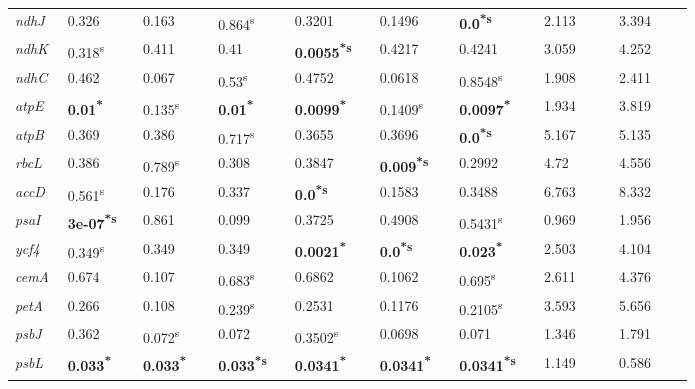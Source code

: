 \documentclass[a4paper]{article}
\begin{document}
\begin{tabular}{p{0.03\linewidth}|p{0.095\linewidth}p{0.095\linewidth}p{0.095\linewidth}|p{0.095\linewidth}p{0.095\linewidth}p{0.095\linewidth}|p{0.095\linewidth}p{0.095\linewidth}}
\textit{ndhJ} & 0.326 & 0.163 & 0.864\textsuperscript{s} & 0.3201 & 0.1496 & \textbf{0.0\textsuperscript{*}\textsuperscript{s}} & 2.113 & 3.394\\
 \rowcolor{black!20} \textit{ndhK} & 0.318\textsuperscript{s} & 0.411 & 0.41 & \textbf{0.0055\textsuperscript{*}\textsuperscript{s}} & 0.4217 & 0.4241 & 3.059 & 4.252\\
\textit{ndhC} & 0.462 & 0.067 & 0.53\textsuperscript{s} & 0.4752 & 0.0618 & 0.8548\textsuperscript{s} & 1.908 & 2.411\\
 \rowcolor{black!20} \textit{atpE} & \textbf{0.01\textsuperscript{*}} & 0.135\textsuperscript{s} & \textbf{0.01\textsuperscript{*}} & \textbf{0.0099\textsuperscript{*}} & 0.1409\textsuperscript{s} & \textbf{0.0097\textsuperscript{*}} & 1.934 & 3.819\\
\textit{atpB} & 0.369 & 0.386 & 0.717\textsuperscript{s} & 0.3655 & 0.3696 & \textbf{0.0\textsuperscript{*}\textsuperscript{s}} & 5.167 & 5.135\\
 \rowcolor{black!20} \textit{rbcL} & 0.386 & 0.789\textsuperscript{s} & 0.308 & 0.3847 & \textbf{0.009\textsuperscript{*}\textsuperscript{s}} & 0.2992 & 4.72 & 4.556\\
\textit{accD} & 0.561\textsuperscript{s} & 0.176 & 0.337 & \textbf{0.0\textsuperscript{*}\textsuperscript{s}} & 0.1583 & 0.3488 & 6.763 & 8.332\\
 \rowcolor{black!20} \textit{psaI} & \textbf{3e-07\textsuperscript{*}\textsuperscript{s}} & 0.861 & 0.099 & 0.3725 & 0.4908 & 0.5431\textsuperscript{s} & 0.969 & 1.956\\
\textit{ycf4} & 0.349\textsuperscript{s} & 0.349 & 0.349 & \textbf{0.0021\textsuperscript{*}} & \textbf{0.0\textsuperscript{*}\textsuperscript{s}} & \textbf{0.023\textsuperscript{*}} & 2.503 & 4.104\\
 \rowcolor{black!20} \textit{cemA} & 0.674 & 0.107 & 0.683\textsuperscript{s} & 0.6862 & 0.1062 & 0.695\textsuperscript{s} & 2.611 & 4.376\\
\textit{petA} & 0.266 & 0.108 & 0.239\textsuperscript{s} & 0.2531 & 0.1176 & 0.2105\textsuperscript{s} & 3.593 & 5.656\\
 \rowcolor{black!20} \textit{psbJ} & 0.362 & 0.072\textsuperscript{s} & 0.072 & 0.3502\textsuperscript{s} & 0.0698 & 0.071 & 1.346 & 1.791\\
\textit{psbL} & \textbf{0.033\textsuperscript{*}} & \textbf{0.033\textsuperscript{*}} & \textbf{0.033\textsuperscript{*}\textsuperscript{s}} & \textbf{0.0341\textsuperscript{*}} & \textbf{0.0341\textsuperscript{*}} & \textbf{0.0341\textsuperscript{*}\textsuperscript{s}} & 1.149 & 0.586\\

\end{tabular}
\end{document}
